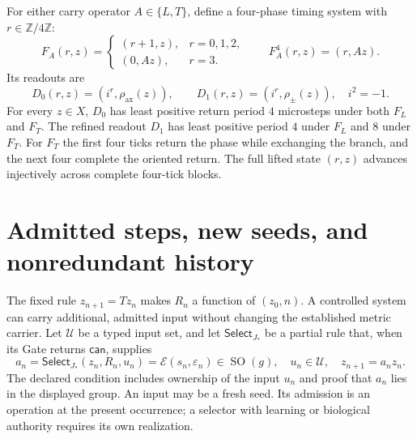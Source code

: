 \documentclass[10pt,letterpaper]{article}
\theoremstyle{definition}\newtheorem{definition}[theorem]{Definition}
\newcommand{\ZZ}{\mathbb Z}
\newcommand{\eps}{\varepsilon}
\newcommand{\SO}{\operatorname{SO}}
\newcommand{\rhoax}{\rho_{\mathrm{ax}}}
\newcommand{\rhos}{\rho_{\pm}}
\begin{document}
For either carry operator $A\in\{L,T\}$, define a four-phase timing system with $r\in\ZZ/4\ZZ$:
\begin{equation}\label{eq:F}
 F_A(r,z)=\begin{cases}
 (r+1,z),&r=0,1,2,\\
 (0,Az),&r=3.
 \end{cases}
 \qquad F_A^4(r,z)=(r,Az).
\end{equation}
Its readouts are
\begin{equation}
 D_0(r,z)=(i^r,\rhoax(z)),\qquad D_1(r,z)=(i^r,\rhos(z)),
 \quad i^2=-1.
\end{equation}
For every $z\in X$, $D_0$ has least positive return period $4$ microsteps under both $F_L$ and $F_T$. The refined readout $D_1$ has least positive period $4$ under $F_L$ and $8$ under $F_T$. For $F_T$ the first four ticks return the phase while exchanging the branch, and the next four complete the oriented return. The full lifted state $(r,z)$ advances injectively across complete four-tick blocks.


\section{Admitted steps, new seeds, and nonredundant history}\label{sec:control}
The fixed rule $z_{n+1}=Tz_n$ makes $R_n$ a function of $(z_0,n)$. A controlled system can carry additional, admitted input without changing the established metric carrier. Let $\mathcal U$ be a typed input set, and let $\mathsf{Select}_{J_*}$ be a partial rule that, when its Gate returns $\mathsf{can}$, supplies
\begin{equation}\label{eq:selector}
 a_n=\mathsf{Select}_{J_*}(z_n,R_n,u_n)=\mathcal E(s_n,\eps_n)\in\SO(g),
 \quad u_n\in\mathcal U,\quad z_{n+1}=a_nz_n .
\end{equation}
The declared condition includes ownership of the input $u_n$ and proof that $a_n$ lies in the displayed group. An input may be a fresh seed. Its admission is an operation at the present occurrence; a selector with learning or biological authority requires its own realization.
\end{document}
